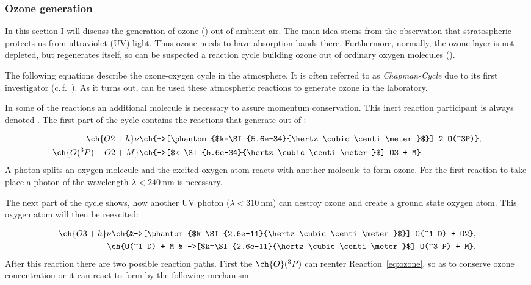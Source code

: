 \subsubsection{Ozone generation}
\label{sec:theory-ozone}

In this section I will discuss the generation of ozone () out of ambient
air. The main idea stems from the observation that stratospheric
 protects us from ultraviolet (UV) light. Thus ozone needs to
have absorption bands there. Furthermore, normally, the ozone layer is
not depleted, but regenerates itself, so can be suspected a reaction
cycle building ozone out of ordinary oxygen molecules ().

The following equations describe the ozone-oxygen cycle in the
atmosphere.  It is often referred to as \emph{Chapman-Cycle} due to
its first investigator (c.\,f.~\cite{chapman,roedel}). As it turns
out, can be used these atmospheric reactions to generate ozone in the
laboratory.

In some of the reactions an additional molecule is necessary to assure
momentum conservation. This inert reaction participant is always
denoted . The first part of the cycle contains the reactions
that generate  out of :

\begin{align}
  \ch{O2 + h}\nu &\ch{->[\phantom{$k=\SI{5.6e-34}{\hertz\cubic\centi\meter}$}] 2 O(^3P)},\nonumber\\
  \ch{O(^3 P) + O2 + M} &\ch{->[$k=\SI{5.6e-34}{\hertz\cubic\centi\meter}$] O3 + M}. \label{eq:ozone}
\end{align}
A photon splits an oxygen molecule and the excited oxygen atom reacts
with another  molecule to form ozone. For the first reaction to
take place a photon of the wavelength
$\lambda < \SI{240}{\nano\meter}$ is necessary.

The next part of the cycle shows, how another UV photon ($\lambda <
\SI{310}{\nano\meter}$) can destroy
ozone and create a ground state oxygen atom. This oxygen atom will
then be reexcited:

\begin{align}
  \ch{O3 + h}\nu \ch{&->[\phantom{$k=\SI{2.6e-11}{\hertz\cubic\centi\meter}$}] O(^1 D) +
  O2}, \label{eq:split}\\
  \ch{O(^1 D) + M & ->[$k=\SI{2.6e-11}{\hertz\cubic\centi\meter}$] O(^3 P) + M}.\nonumber
\end{align}
After this reaction there are two possible reaction paths. First the
$\ch{O}(^3 P)$ can reenter Reaction~\eqref{eq:ozone}, so as to
conserve ozone concentration or it can react to form  by the
following mechanism

